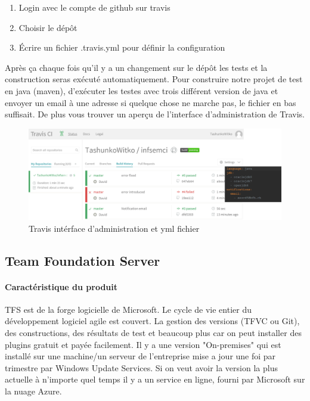 \begin{enumerate}
	\item Login avec le compte de github sur travis
	\item Choisir le dépôt
	\item Écrire un fichier .travis.yml pour définir la configuration
\end{enumerate}

Après ça chaque fois qu'il y a un changement sur le dépôt les tests et la construction seras exécuté automatiquement. Pour construire notre projet de test en java (maven), d'exécuter les testes avec trois différent version de java et envoyer un email à une adresse si quelque chose ne marche pas, le fichier en bas suffisait. De plus vous trouver un aperçu de l'interface d'administration de Travis.

\begin{figure}[H]
	\centering
		\includegraphics[scale=0.2]{bilder/travisciymlfile}
	\caption{Travis intérface d'administration et yml fichier}
	\label{fig:travisgui}
\end{figure}
\clearpage



\subsection{Team Foundation Server}
\paragraph{Caractéristique du produit} TFS est de la forge logicielle de Microsoft. Le cycle de vie entier du développement logiciel agile est couvert. La gestion des versions (TFVC ou Git), des constructions, des résultats de test et beaucoup plus car on peut installer des plugins gratuit et payée facilement. Il y a une version "On-premises" qui est installé sur une machine/un serveur de l'entreprise mise a jour une foi par trimestre par Windows Update Services. Si on veut avoir la version la plus actuelle à n'importe quel temps il y a un service en ligne, fourni par Microsoft sur la nuage Azure.

